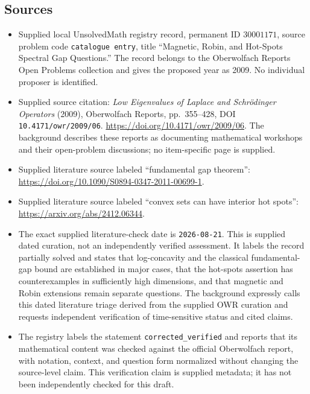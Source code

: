 \documentclass[11pt]{article}
\begin{document}
\subsection{Sources}
\begin{itemize}
\item Supplied local UnsolvedMath registry record, permanent ID \(30001171\), source problem code \texttt{catalogue entry}, title ``Magnetic, Robin, and Hot-Spots Spectral Gap Questions.'' The record belongs to the Oberwolfach Reports Open Problems collection and gives the proposed year as 2009. No individual proposer is identified.
\item Supplied source citation: \emph{Low Eigenvalues of Laplace and Schr\"odinger Operators} (2009), Oberwolfach Reports, pp.~355--428, DOI \texttt{10.4171/owr/2009/06}. \url{https://doi.org/10.4171/owr/2009/06}. The background describes these reports as documenting mathematical workshops and their open-problem discussions; no item-specific page is supplied.
\item Supplied literature source labeled ``fundamental gap theorem'': \url{https://doi.org/10.1090/S0894-0347-2011-00699-1}.
\item Supplied literature source labeled ``convex sets can have interior hot spots'': \url{https://arxiv.org/abs/2412.06344}.
\item The exact supplied literature-check date is \texttt{2026-08-21}. This is supplied dated curation, not an independently verified assessment. It labels the record partially solved and states that log-concavity and the classical fundamental-gap bound are established in major cases, that the hot-spots assertion has counterexamples in sufficiently high dimensions, and that magnetic and Robin extensions remain separate questions. The background expressly calls this dated literature triage derived from the supplied OWR curation and requests independent verification of time-sensitive status and cited claims.
\item The registry labels the statement \texttt{corrected\_verified} and reports that its mathematical content was checked against the official Oberwolfach report, with notation, context, and question form normalized without changing the source-level claim. This verification claim is supplied metadata; it has not been independently checked for this draft.
\end{itemize}
\end{document}
